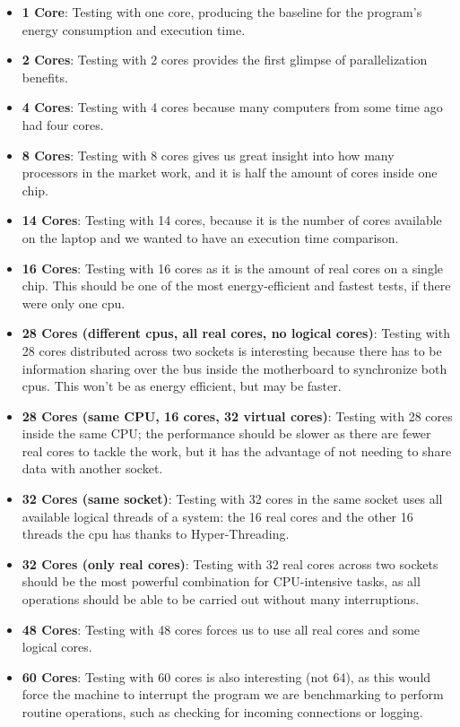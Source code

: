 \begin{itemize}
    \item \textbf{1 Core}: Testing with one core, producing the baseline for the program's energy consumption and execution time.
    \item \textbf{2 Cores}: Testing with 2 cores provides the first glimpse of parallelization benefits.
    \item \textbf{4 Cores}: Testing with 4 cores because many computers from some time ago had four cores.
    \item \textbf{8 Cores}: Testing with 8 cores gives us great insight into how many processors in the market work, and it is half the amount of cores inside one chip.
    \item \textbf{14 Cores}: Testing with 14 cores, because it is the number of cores available on the laptop and we wanted to have an execution time comparison.
    \item \textbf{16 Cores}: Testing with 16 cores as it is the amount of real cores on a single chip. This should be one of the most energy-efficient and fastest tests, if there were only one \gls{cpu}.
    \item \textbf{28 Cores (different \glspl{cpu}, all real cores, no logical cores)}: Testing with 28 cores distributed across two sockets is interesting because there has to be information sharing over the bus inside the motherboard to synchronize both \glspl{cpu}. This won't be as energy efficient, but may be faster.
    \item \textbf{28 Cores (same CPU, 16 cores, 32 virtual cores)}: Testing with 28 cores inside the same CPU; the performance should be slower as there are fewer real cores to tackle the work, but it has the advantage of not needing to share data with another socket.
    \item \textbf{32 Cores (same socket)}: Testing with 32 cores in the same socket uses all available logical threads of a system: the 16 real cores and the other 16 threads the \gls{cpu} has thanks to Hyper-Threading.
    \item \textbf{32 Cores (only real cores)}: Testing with 32 real cores across two sockets should be the most powerful combination for CPU-intensive tasks, as all operations should be able to be carried out without many interruptions.
    \item \textbf{48 Cores}: Testing with 48 cores forces us to use all real cores and some logical cores.
    \item \textbf{60 Cores}: Testing with 60 cores is also interesting (not 64), as this would force the machine to interrupt the program we are benchmarking to perform routine operations, such as checking for incoming connections or logging.
\end{itemize}

